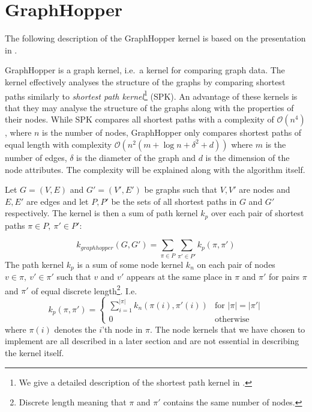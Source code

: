 \documentclass{article}
\begin{document}
\section{GraphHopper}
\label{section:graphhopper}
The following description of the GraphHopper kernel is based on the presentation in \cite{graphhopper}.

GraphHopper is a graph kernel, i.e.\ a kernel for comparing graph data. The kernel effectively analyses the structure of the graphs by comparing shortest paths similarly to \textit{shortest path kernel}\footnote{We give a detailed description of the shortest path kernel in \cite{svm-graph-kernels}.} (SPK)\cite{shortest-path}. An advantage of these kernels is that they may analyse the structure of the graphs along with the properties of their nodes.
While SPK compares all shortest paths with a complexity of $\mathcal{O}(n^4)$, where $n$ is the number of nodes, GraphHopper only compares shortest paths of equal length with complexity $\mathcal{O}(n^2(m+\log n+\delta^2 + d))$ where $m$ is the number of edges, $\delta$ is the diameter of the graph and $d$ is the dimension of the node attributes. The complexity will be explained along with the algorithm itself.

Let $G=(V,E)$ and $G'=(V',E')$ be graphs such that $V,V'$ are nodes and $E,E'$ are edges and let $P,P'$ be the sets of all shortest paths in $G$ and $G'$ respectively. The kernel is then a sum of path kernel $k_p$ over each pair of shortest paths $\pi\in P,\ \pi'\in P'$:

\begin{equation}
\label{eq:k}
k_{graphhopper}(G,G')=\sum_{\pi\in P}\sum_{\pi'\in P'}k_p(\pi, \pi')
\end{equation}
The path kernel $k_p$ is a sum of some node kernel $k_n$ on each pair of nodes $v\in\pi,\ v'\in\pi'$ such that $v$ and $v'$ appears at the same place in $\pi$ and $\pi'$ for pairs $\pi$ and $\pi'$ of equal discrete length\footnote{Discrete length meaning that $\pi$ and $\pi'$ contains the same number of nodes.}. I.e.
\begin{equation}
\label{eq:k_p}
k_p(\pi, \pi')=\begin{cases}
\sum_{i=1}^{|\pi|}k_n(\pi(i), \pi'(i)) & \text{for }|\pi|=|\pi'|\\
0 & \text{otherwise}
\end{cases}
\end{equation}
where $\pi(i)$ denotes the $i$'th node in $\pi$. The node kernels that we have chosen to implement are all described in a later section and are not essential in describing the kernel itself.
\end{document}
